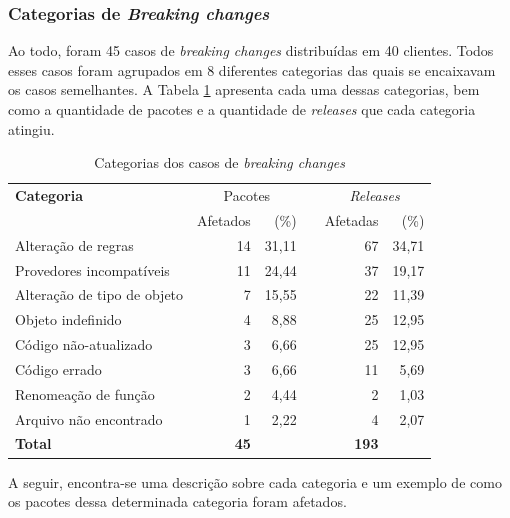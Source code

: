 \subsubsection{Categorias de \textit{Breaking changes}}
Ao todo, foram 45 casos de \textit{breaking changes} distribuídas em 40 clientes. Todos esses casos foram agrupados em 8 diferentes categorias das quais se encaixavam os casos semelhantes. A Tabela \ref{tab:bc_category} apresenta cada uma dessas categorias, bem como a quantidade de pacotes e a quantidade de \textit{releases} que cada categoria atingiu.

\begin{table}\centering
	\begin{tabular}{lrrrrr} \toprule
		\textbf{Categoria} & \multicolumn{2}{c}{Pacotes} & \phantom{ab} & \multicolumn{2}{c}{\textit{Releases}}
		\\
		\cmidrule{2-3} \cmidrule{5-6}
		& Afetados & (\%) && Afetadas & (\%) \\
		Alteração de regras          & 14              & 31,11 && 67                          & 34,71 \\
		Provedores incompatíveis     & 11              & 24,44 && 37                          & 19,17 \\
		Alteração de tipo de objeto  & 7               & 15,55 && 22                          & 11,39 \\
		Objeto indefinido            & 4               & 8,88  && 25                          & 12,95 \\
		Código não-atualizado        & 3               & 6,66  && 25                          & 12,95 \\
		Código errado                & 3               & 6,66  && 11                          & 5,69  \\
		Renomeação de função         & 2               & 4,44  && 2                           & 1,03  \\
		Arquivo não encontrado       & 1               & 2,22  && 4                           & 2,07  \\ \hline
		\textbf{Total}               & \textbf{45}     &       && \textbf{193}              &       \\
		\bottomrule
	\end{tabular}
    \caption{Categorias dos casos de \textit{breaking changes}}
    \label{tab:bc_category}
\end{table}

A seguir, encontra-se uma descrição sobre cada categoria e um exemplo de como os pacotes dessa determinada categoria foram afetados.

